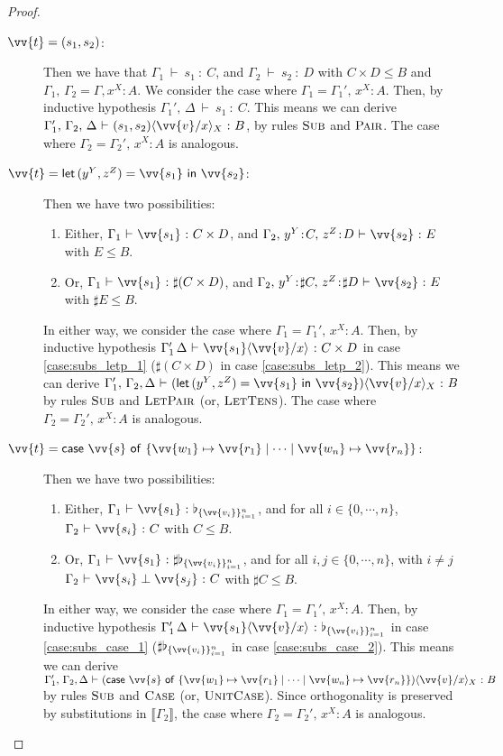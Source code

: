 \documentclass[runningheads,orivec,envcountsame,envcountsect]{llncs}
\newcommand\ansubst[2]{\ensuremath{\langle #1 \rangle_{#2}}}
\def\Pair#1#2{(#1,#2)} %
\def\letkeyword{\mathsf{let}}
\def\inkeyword{\mathsf{in}}
\def\LetP#1#2#3#4#5#6{\letkeyword\,\Pair{#1^{#2}}{#3^{#4}}=#5~\inkeyword~#6}
\def\gencase#1#2#3#4#5{\ensuremath{\mathsf{case}~#1~\mathsf{of}~\{#2\mapsto #4 \mid \dotsb \mid #3\mapsto #5\}}}
\def\sem#1{\llbracket#1\rrbracket}
\def\TYP#1#2#3{#1~{\vdash}~#2~{:}~#3}
\def\SORTH#1#2#3#4{#1~{\vdash}~#2\perp#3~{:}~#4}
\newcommand\basis[1]{\ensuremath{\flat_{#1}}}
\begin{document}
\begin{proof}
\begin{description}
    \item[$\vv{t}=\Pair{s_1}{s_2}$:] Then we have that $\TYP{\Gamma_1}{s_1}{C}$, and $\TYP{\Gamma_2}{s_2}{D}$ with $C\times D\leq B$ and $\Gamma_1,\,\Gamma_2 = \Gamma,x^{X}\!:\!A$. We consider the case where $\Gamma_1 = \Gamma_1',\,x^{X}\!:\!A$. Then, by inductive hypothesis $\TYP{\Gamma_1',\,\Delta}{s_1}{C}$. This means we can derive $\TYP{\Gamma_1',\,\Gamma_2,\,\Delta}{\Pair{s_1}{s_2}\ansubst{\vv{v}/x}{X}}{B}$, by rules $\textsc{Sub}$ and $\textsc{Pair}$. The case where $\Gamma_2 = \Gamma_2',\,x^{X}\!:\!A$ is analogous.
    
    \item[$\vv{t}=\LetP{y}{Y}{z}{Z}{\vv{s_1}}{\vv{s_2}}$:] Then we have two possibilities:
      \begin{enumerate}
        \item\label{case:subs_letp_1} Either, $\TYP{\Gamma_1}{\vv{s_1}}{C\times D}$, and $\TYP{\Gamma_2,\,y^{Y}\!:\!C,\,z^{Z}\!:\!D}{\vv{s_2}}{E}$ with $E\leq B$.
        \item\label{case:subs_letp_2} Or, $\TYP{\Gamma_1}{\vv{s_1}}{\sharp(C\times D)}$, and $\TYP{\Gamma_2,\,y^{Y}\!:\!\sharp{C},\,z^{Z}\!:\!\sharp{D}}{\vv{s_2}}{E}$ with $\sharp E\leq B$.
      \end{enumerate}
      In either way, we consider the case where $\Gamma_1 = \Gamma_1',\,x^{X}\!:\!A$. Then, by inductive hypothesis $\TYP{\Gamma_1'\,\Delta}{\vv{s_1}\ansubst{\vv{v}/x}{}}{C\times D}$ in case \ref{case:subs_letp_1} ($\sharp (C\times D)$ in case \ref{case:subs_letp_2}). This means we can derive $\TYP{\Gamma_1',\,\Gamma_2,\Delta}{(\LetP{y}{Y}{z}{Z}{\vv{s_1}}{\vv{s_2}})\ansubst{\vv{v}/x}{X}}{B}$ by rules $\textsc{Sub}$ and $\textsc{LetPair}$ (or, $\textsc{LetTens}$). The case where $\Gamma_2 = \Gamma_2',\,x^{X}\!:\!A$ is analogous.

    \item[$\vv{t}=\gencase{\vv{s}}{\vv{w_1}}{\vv{w_n}}{\vv{r_1}}{\vv{r_n}}$:] Then we have two possibilities:
    \begin{enumerate}
      \item\label{case:subs_case_1} Either, $\TYP{\Gamma_1}{\vv{s_1}}{\basis{\{\vv{v_i}\}_{i=1}^n}}$, and for all $i\in\{0,\dotsb,n\}$, $\TYP{\Gamma_2}{\vv{s_i}}{C}$ with $C\leq B$.
      \item\label{case:subs_case_2} Or, $\TYP{\Gamma_1}{\vv{s_1}}{\sharp\basis{\{\vv{v_i}\}_{i=1}^n}}$, and for all $i,j\in\{0,\dotsb,n\}$, with $i\neq j$ $\SORTH{\Gamma_2}{\vv{s_i}}{\vv{s_j}}{C}$ with $\sharp C\leq B$.
    \end{enumerate}
    In either way, we consider the case where $\Gamma_1 = \Gamma_1',\,x^{X}\!:\!A$. Then, by inductive hypothesis $\TYP{\Gamma_1'\,\Delta}{\vv{s_1}\ansubst{\vv{v}/x}{}}{\basis{\{\vv{v_i}\}_{i=1}^n}}$ in case \ref{case:subs_case_1} ($\sharp \basis{\{\vv{v_i}\}_{i=1}^n}$ in case \ref{case:subs_case_2}). This means we can derive $\TYP{\Gamma_1',\,\Gamma_2,\Delta}{(\gencase{\vv{s}}{\vv{w_1}}{\vv{w_n}}{\vv{r_1}}{\vv{r_n}})\ansubst{\vv{v}/x}{X}}{B}$ by rules $\textsc{Sub}$ and $\textsc{Case}$ (or, $\textsc{UnitCase}$). Since orthogonality is preserved by substitutions in $\sem{\Gamma_2}$, the case where $\Gamma_2 = \Gamma_2',\,x^{X}\!:\!A$ is analogous.


\end{description}
\end{proof}
\end{document}
